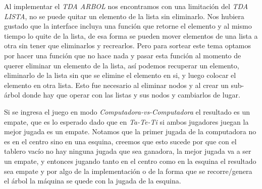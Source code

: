 \documentclass[12pt,a4paper]{article}
\begin{document}
Al implementar el \emph{TDA ARBOL} nos encontramos con una limitaci\'on del \emph{TDA LISTA}, no se puede quitar un elemento de la lista sin eliminarlo. Nos hubiera gustado que la interface incluya una funci\'on que retorne el elemento y al mismo tiempo lo quite de la lista, de esa forma se pueden mover elementos de una lista a otra sin tener que eliminarlos y recrearlos. Pero para sortear este tema optamos por hacer una funci\'on que no hace nada y pasar esta funci\'on al momento de querer eliminar un elemento de la lista, as\'i podemos recuperar un elemento, eliminarlo de la lista sin que se elimine el elemento en si, y luego colocar el elemento en otra lista. Esto fue necesario al eliminar nodos y al crear un sub-\'arbol donde hay que operar con las listas y sus nodos y cambiarlos de lugar.

Si se ingresa el juego en modo \emph{Computadora-vs-Computadora} el resultado es un empate, que es lo esperado dado que en \emph{Ta-Te-Ti} si ambos jugadores juegan la mejor jugada es un empate. Notamos que la primer jugada de la computadora no es en el centro sino en una esquina, creemos que esto sucede por que con el tablero vac\'io no hay ninguna jugada que sea ganadora, la mejor jugada va a ser un empate, y entonces jugando tanto en el centro como en la esquina el resultado sea empate y por algo de la implementaci\'on o de la forma que se recorre/genera el \'arbol la m\'aquina se quede con la jugada de la esquina.
\end{document}
